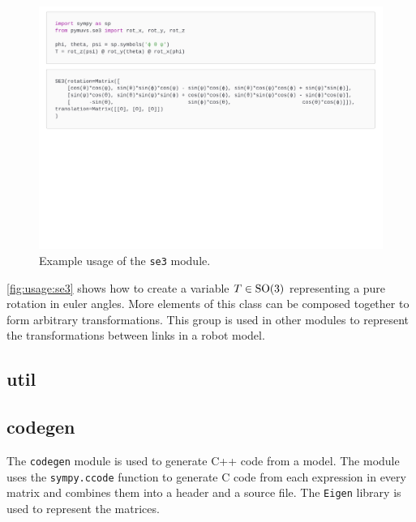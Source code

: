 \begin{figure}[h]
    \centering
    \includegraphics[page=1,width=\linewidth,trim=0 11cm 0 0]{assets/se3.pdf}
    \caption{Example usage of the \texttt{se3} module.}
    \label{fig:usage:se3}
\end{figure}

\autoref{fig:usage:se3} shows how to create a variable $T \in \operatorname{SO}(3)$ representing
a pure rotation in euler angles. More elements of this class can be composed
together to form arbitrary transformations. This group is used in other modules
to represent the transformations between links in a robot model.

\subsection{util}


\subsection{codegen}
The \texttt{codegen} module is used to generate C++ code from a model. The module
uses the \texttt{sympy.ccode} function to generate C code from
each expression in every matrix and combines them into a header and a source
file. The \texttt{Eigen} library \cite{eigen3} is used to represent the matrices.

